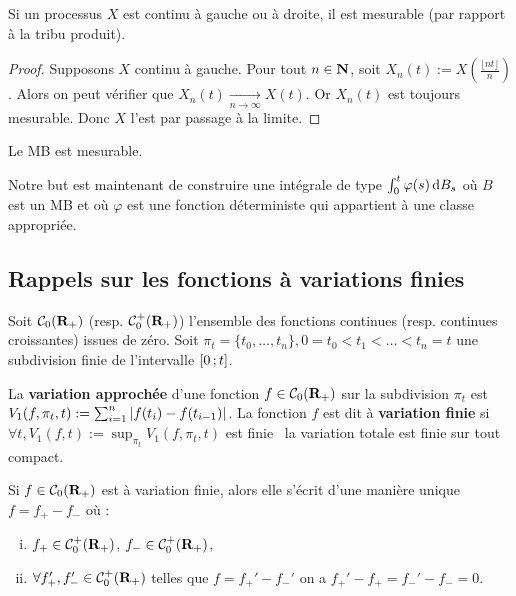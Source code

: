 	\begin{pop}
		Si un processus $X$ est continu à gauche ou à droite, il est mesurable (par rapport à la tribu produit).
	\end{pop}
	
	\begin{proof}
		Supposons $X$ continu à gauche.
		Pour tout $n \in \mathbf{N}$, soit $X_n(t) := X \left( \frac{\lfloor nt \rfloor}{n} \right)$.
		Alors on peut vérifier que $X_n(t) \underset{n \to \infty}{\longrightarrow} X(t)$.
		Or $X_n(t)$ est toujours mesurable.
		Donc $X$ l'est par passage à la limite.
	\end{proof}
	
	\begin{cor}
		Le MB est mesurable.
	\end{cor}

	Notre but est maintenant de construire une intégrale de type $\int_0^t \varphi(s) \mathop{}\mathopen{}\mathrm{d} B_s$ où $B$ est un MB et où $\varphi$ est une fonction déterministe qui appartient à une classe appropriée.


\subsection{Rappels sur les fonctions à variations finies}

	Soit $\mathcal{C}_0(\mathbf{R}_+)$ (resp. $\mathcal{C}_0^+(\mathbf{R}_+)$) l'ensemble des fonctions continues (resp. continues croissantes) issues de zéro.
	Soit $\pi_t = \{ t_0,\ldots,t_n \}, 0 = t_0 < t_1 < \ldots < t_n = t$ une subdivision finie de l'intervalle $\mathopen{}\mathclose{\left[0\mathclose{}\mathpunct{};t\right]}$.
	
	\begin{defn}
		La \textbf{variation approchée} d'une fonction $f \in \mathcal{C}_0(\mathbf{R}_+)$ sur la subdivision $\pi_t$ est $V_1(f,\pi_t,t) := \sum_{i = 1}^n \left\lvert f(t_i) - f(t_{i - 1})\right\rvert$.
		La fonction $f$ est dit à \textbf{variation finie} si $\forall t, V_1(f,t) := \sup_{\pi_t} V_1(f,\pi_t,t)$ est finie \textrightarrow\ la variation totale est finie sur tout compact.
	\end{defn}
	
	\begin{pop}
		Si $f \in \mathcal{C}_0(\mathbf{R}_+)$ est à variation finie, alors elle s'écrit d'une manière unique $f = f_+ - f_-$ où :
		\begin{enumerate}[(i)]
			\item $f_+ \in \mathcal{C}_0^+(\mathbf{R}_+)$, $f_- \in \mathcal{C}_0^+(\mathbf{R}_+)$,
			\item $\forall f_+',f_-' \in \mathcal{C}_0^+(\mathbf{R}_+)$ telles que $f = f_+' - f_-'$ on a $f_+' - f_+ = f_-' - f_- = 0$.
		\end{enumerate}
	\end{pop}
	
